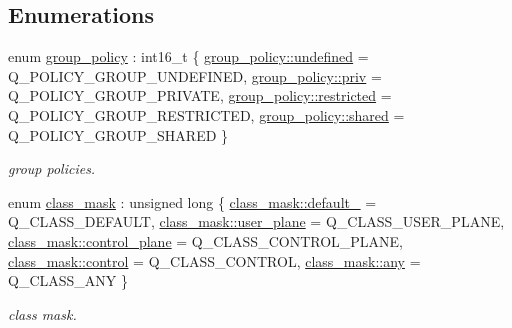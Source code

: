 \subsection*{Enumerations}
\begin{DoxyCompactItemize}
\item 
enum \hyperlink{namespacepfq_ac41249c8510558905b01fa4d866a38d7}{group\+\_\+policy} \+: int16\+\_\+t \{ \hyperlink{namespacepfq_ac41249c8510558905b01fa4d866a38d7a5e543256c480ac577d30f76f9120eb74}{group\+\_\+policy\+::undefined} = Q\+\_\+\+P\+O\+L\+I\+C\+Y\+\_\+\+G\+R\+O\+U\+P\+\_\+\+U\+N\+D\+E\+F\+I\+N\+ED, 
\hyperlink{namespacepfq_ac41249c8510558905b01fa4d866a38d7a908b453051b556e053731714a5193921}{group\+\_\+policy\+::priv} = Q\+\_\+\+P\+O\+L\+I\+C\+Y\+\_\+\+G\+R\+O\+U\+P\+\_\+\+P\+R\+I\+V\+A\+TE, 
\hyperlink{namespacepfq_ac41249c8510558905b01fa4d866a38d7ac89b33f8b3f6f452ef6f07d397b5dcdf}{group\+\_\+policy\+::restricted} = Q\+\_\+\+P\+O\+L\+I\+C\+Y\+\_\+\+G\+R\+O\+U\+P\+\_\+\+R\+E\+S\+T\+R\+I\+C\+T\+ED, 
\hyperlink{namespacepfq_ac41249c8510558905b01fa4d866a38d7a9e81e7b963c71363e2fb3eefcfecfc0e}{group\+\_\+policy\+::shared} = Q\+\_\+\+P\+O\+L\+I\+C\+Y\+\_\+\+G\+R\+O\+U\+P\+\_\+\+S\+H\+A\+R\+ED
 \}\begin{DoxyCompactList}\small\item\em group policies. \end{DoxyCompactList}
\item 
enum \hyperlink{namespacepfq_a96af1f5ed530eff563eb917516758fbb}{class\+\_\+mask} \+: unsigned long \{ \newline
\hyperlink{namespacepfq_a96af1f5ed530eff563eb917516758fbba172b03053216c6158fe380805998ad6c}{class\+\_\+mask\+::default\+\_\+} = Q\+\_\+\+C\+L\+A\+S\+S\+\_\+\+D\+E\+F\+A\+U\+LT, 
\hyperlink{namespacepfq_a96af1f5ed530eff563eb917516758fbba539d70f37267eda88597177e215a6d2a}{class\+\_\+mask\+::user\+\_\+plane} = Q\+\_\+\+C\+L\+A\+S\+S\+\_\+\+U\+S\+E\+R\+\_\+\+P\+L\+A\+NE, 
\hyperlink{namespacepfq_a96af1f5ed530eff563eb917516758fbba1ed75f78f4a1cf2529490db57b294978}{class\+\_\+mask\+::control\+\_\+plane} = Q\+\_\+\+C\+L\+A\+S\+S\+\_\+\+C\+O\+N\+T\+R\+O\+L\+\_\+\+P\+L\+A\+NE, 
\hyperlink{namespacepfq_a96af1f5ed530eff563eb917516758fbbafc5364bf9dbfa34954526becad136d4b}{class\+\_\+mask\+::control} = Q\+\_\+\+C\+L\+A\+S\+S\+\_\+\+C\+O\+N\+T\+R\+OL, 
\newline
\hyperlink{namespacepfq_a96af1f5ed530eff563eb917516758fbba100b8cad7cf2a56f6df78f171f97a1ec}{class\+\_\+mask\+::any} = Q\+\_\+\+C\+L\+A\+S\+S\+\_\+\+A\+NY
 \}\begin{DoxyCompactList}\small\item\em class mask. \end{DoxyCompactList}
\end{DoxyCompactItemize}
